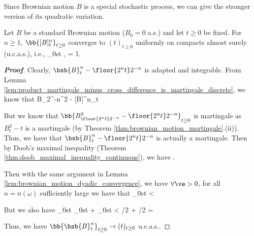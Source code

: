 Since Brownian motion $B$ is a special stochastic process, we can give the stronger version of its quadratic variation.

\begin{theorem}\label{thm:brownian_motion_quadratic_variation_ucas}
Let $B$ be a standard Brownian motion ($B_0 = 0$ a.s.) and let $t \geq 0$ be fixed. For $n \geq 1$, $\bb{[B]^n_t}_{t\geq 0}$ converges to $(t)_{t\geq 0}$ uniformly on compacts almost surely (u.c.a.s.), i.e.,
\be
\sup_{0\leq s\leq t}  \quad {},\qquad {}\qquad \pro{} = 1.
\ee
\end{theorem}


\begin{proof}[\bf Proof]%
Clearly, $\bsb{B}^n_t - \floor{2^nt}2^{-n}$ is adapted and integrable. From Lemma \ref{lem:product_martingale_minus_cross_difference_is_martingale_discrete}, we know that
\be
B_{2^{-n}}^2 - [B]^n_t \quad {}
\ee

But we know that $\bb{B_{\floor{2^nt}2^{-n}}^2 - \floor{2^nt}2^{-n}}_{t\geq 0}$ is martingale as $B_t^2 -t$ is a martingale (by Theorem \ref{thm:brownian_motion_martingale}.(ii)). Thus, we have that $\bsb{B}^n_t - \floor{2^nt}2^{-n}$ is actually a martingale. Then by Doob's maximal inequality (Theorem \ref{thm:doob_maximal_inequality_continuous}), we have
\be
\pro{} \leq {}\E{}.
\ee

Then with the same argument in Lemma \ref{lem:brownian_motion_dyadic_convergence}, we have $\forall \ve >0$, for all $n = n(\omega)$ sufficiently large we have that
\be
\sup_{0\leq s\leq t} < \ve {}
\ee

But we also have
\be
\sup_{0\leq s\leq t} \leq \sup_{0\leq s\leq t} + \sup_{0\leq s\leq t} < \ve/2 + \ve/2 = \ve\quad {}
\ee

Thus, we have $\bb{\bsb{B}^n_t}_{t\geq 0} \to (t)_{t\geq 0}$ u.c.a.s.. %
\end{proof}


